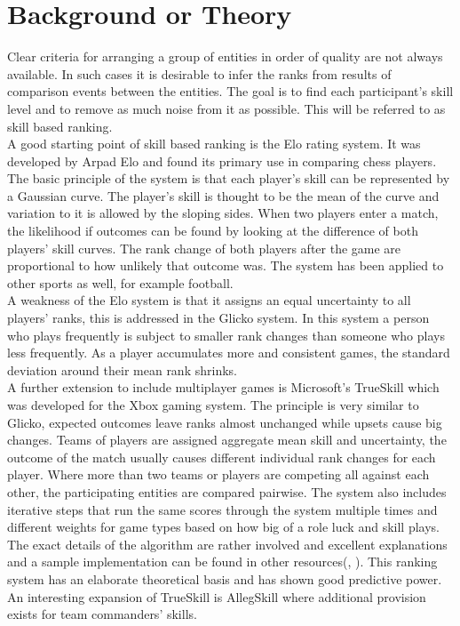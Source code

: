 \section{Background or Theory}
Clear criteria for arranging a group of entities in order of quality are not always available. In such cases it is desirable to infer the ranks from results of comparison events between the entities. The goal is to find each participant's skill level and to remove as much noise from it as possible. This will be referred to as skill based ranking.\\
A good starting point of skill based ranking is the Elo rating system\cite{elo}. It was developed by Arpad Elo and found its primary use in comparing chess players. The basic principle of the system is that each player's skill can be represented by a Gaussian curve. The player's skill is thought to be the mean of the curve and variation to it is allowed by the sloping sides. When two players enter a match, the likelihood if outcomes can be found by looking at the difference of both players' skill curves. The rank change of both players after the game are proportional to how unlikely that outcome was. The system has been applied to other sports as well, for example football\cite{football}.\\
A weakness of the Elo system is that it assigns an equal uncertainty to all players' ranks, this is addressed in the Glicko system\cite{glicko}. In this system a person who plays frequently is subject to smaller rank changes than someone who plays less frequently. As a player accumulates more and consistent games, the standard deviation around their mean rank shrinks.\\
A further extension to include multiplayer games is Microsoft's TrueSkill which was developed for the Xbox gaming system\cite{trueskill}. The principle is very similar to Glicko, expected outcomes leave ranks almost unchanged while upsets cause big changes. Teams of players are assigned aggregate mean skill and uncertainty, the outcome of the match usually causes different individual rank changes for each player. Where more than two teams or players are competing all against each other, the participating entities are compared pairwise. The system also includes iterative steps that run the same scores through the system multiple times and different weights for game types based on how big of a role luck and skill plays. The exact details of the algorithm are rather involved and excellent explanations and a sample implementation can be found in other resources(\cite{trueskillMicrosoft}, \cite{trueskillSimple}). This ranking system has an elaborate theoretical basis and has shown good predictive power\cite{trueskill}. An interesting expansion of TrueSkill is AllegSkill\cite{allegskill} where additional provision exists for team commanders' skills.\\
